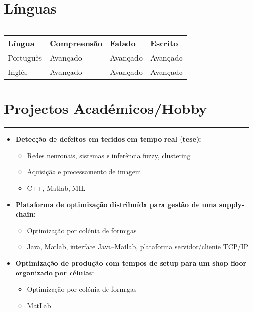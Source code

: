 \documentclass[a4paper,portuguese]{article}
\newcommand{\topic}[1]{
\section*{#1} \vspace{-6mm}
\rule{\columnwidth}{.25mm}
}
\begin{document}
\topic{Línguas}

\begin{tabular}{llll}
Língua & Compreensão & Falado & Escrito \\
\hline
Português & Avançado & Avançado & Avançado \\
Inglês & Avançado & Avançado & Avançado \\
\end{tabular}

\topic{Projectos Académicos/Hobby}
\begin{itemize}
    \setlength{\itemsep}{-1mm}
    \item[] {\bf Detecção de defeitos em tecidos em tempo real (tese):}\\ \vspace{-7mm}
    \begin{itemize}
        \setlength{\itemsep}{-1mm}
        \item[] Redes neuronais, sistemas e inferência fuzzy, clustering
        \item[] Aquisição e processamento de imagem
        \item[] C++, Matlab, MIL
    \end{itemize}

    \item[] {\bf  Plataforma de optimização distribuída para gestão de uma supply-chain:}\\ \vspace{-7mm}
    \begin{itemize}
        \setlength{\itemsep}{-1mm}
        \item Optimização por colónia de formigas
        \item Java, Matlab, interface Java--Matlab, plataforma servidor/cliente TCP/IP
    \end{itemize}

    \item[] {\bf  Optimização de produção com tempos de setup para um shop floor organizado por células:}\\ \vspace{-7mm}
    \begin{itemize}
    \setlength{\itemsep}{-1mm}
        \item Optimização por colónia de formigas
        \item MatLab
    \end{itemize}


\end{itemize}
\end{document}
